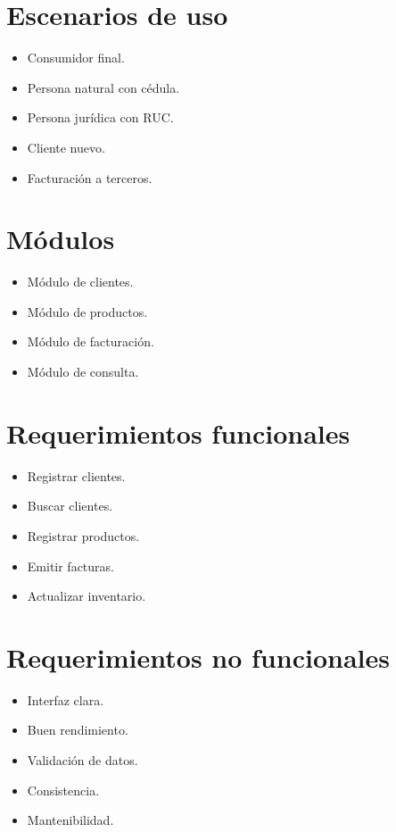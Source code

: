 \documentclass[12pt]{article}
\begin{document}
\section{Escenarios de uso}
\begin{itemize}
\item Consumidor final.
\item Persona natural con cédula.
\item Persona jurídica con RUC.
\item Cliente nuevo.
\item Facturación a terceros.
\end{itemize}

\section{Módulos}
\begin{itemize}
\item Módulo de clientes.
\item Módulo de productos.
\item Módulo de facturación.
\item Módulo de consulta.
\end{itemize}

\section{Requerimientos funcionales}
\begin{itemize}
\item Registrar clientes.
\item Buscar clientes.
\item Registrar productos.
\item Emitir facturas.
\item Actualizar inventario.
\end{itemize}

\section{Requerimientos no funcionales}
\begin{itemize}
\item Interfaz clara.
\item Buen rendimiento.
\item Validación de datos.
\item Consistencia.
\item Mantenibilidad.
\end{itemize}
\end{document}
